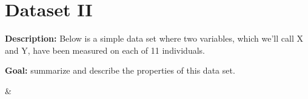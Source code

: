 \documentclass[12pt]{article}
\begin{document}
\section*{Dataset II}

\textbf{Description:} Below is a simple  data set where two variables, which we'll call X and Y, have been measured on each of 11 individuals.

\textbf{Goal:} summarize and describe the properties of this data set.

\begin{center}
%
{\csvcoli & \csvcolii}
\end{center}
\end{document}
